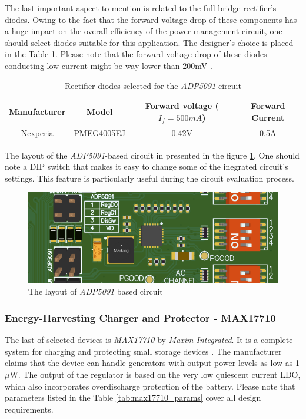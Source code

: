 \documentclass[12pt,a4paper]{article}
\begin{document}
The last important aspect to mention is related to the full bridge rectifier's diodes. Owing to the fact that the forward voltage drop of these components has a huge impact on the overall efficiency of the power management circuit, one should select diodes suitable for this application. The designer's choice is placed in the Table \ref{tab:adp5091_diodes}. Please note that the forward voltage drop of these diodes conducting low current might be way lower than 200mV \cite{diodes_params}.
\begin{table}[ht!]
\begin{tabular}{|c|c|c|c|}
\hline
\textbf{Manufacturer} & \textbf{Model} & \textbf{Forward voltage ($I_f=500mA$)} & \textbf{Forward Current}\\ \hline
 Nexperia & PMEG4005EJ & 0.42V & 0.5A      \\ \hline

\end{tabular}
\caption{Rectifier diodes selected for the \textit{ADP5091} circuit \cite{diodes_params}}
\label{tab:adp5091_diodes}
\end{table}
\par

The layout of the \textit{ADP5091}-based circuit in presented in the figure \ref{fig:adp5091layout}. One should note a DIP switch that makes it easy to change some of the inegrated circuit's settings. This feature is particularly useful during the circuit evaluation process.
\begin{figure}[ht!]
\includegraphics[scale=0.8]{adp5091_layout.png}
\caption{The layout of \textit{ADP5091} based circuit}
\label{fig:adp5091layout}
\end{figure}
\par
\subsubsection{Energy-Harvesting Charger and Protector - MAX17710}
The last of selected devices is \textit{MAX17710} by \textit{Maxim Integrated}. It is a complete system for charging and protecting small storage devices \cite{max17710_params}. The manufacturer claims that the device can handle generators with output power levels as low as 1$\mu$W. The output of the regulator is based on the very low quiescent current LDO, which also incorporates overdischarge protection of the battery. Please note that parameters listed in the Table \ref{tab:max17710_params} cover all design requirements.
\par
\end{document}
